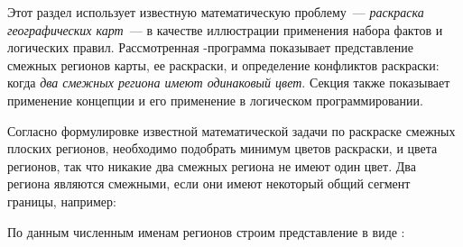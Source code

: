 
Этот раздел использует известную математическую проблему\ --- \emph{раскраска
географических карт}\ --- в качестве иллюстрации применения набора фактов и
логических правил. Рассмотренная \prolog-программа показывает представление
смежных регионов карты, ее раскраски, и определение конфликтов раскраски: когда
\emph{два смежных региона имеют одинаковый цвет}.  Секция также показывает
применение концепции  и его
применение в логическом программировании.

Согласно формулировке известной математической задачи по раскраске смежных
плоских регионов, необходимо подобрать
минимум цветов раскраски, и цвета регионов, так что никакие два смежных региона
не имеют один цвет. Два региона являются смежными, если они имеют некоторый
общий сегмент границы, например:


По данным численным именам регионов строим представление в виде :


